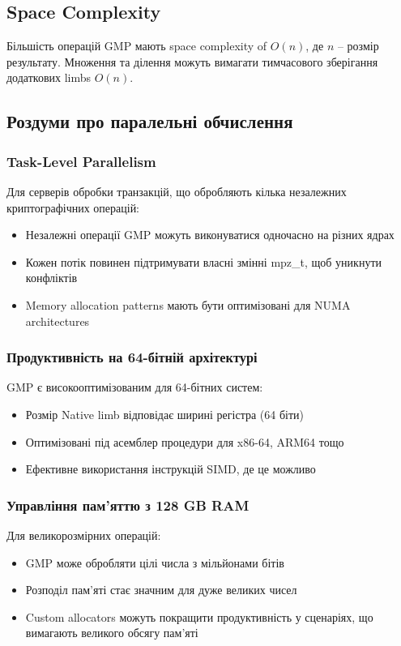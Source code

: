 \subsection{Space Complexity}
Більшість операцій GMP мають space complexity of $O(n)$, де $n$ -- розмір результату. Множення та ділення
можуть вимагати тимчасового зберігання додаткових limbs $O(n)$.

\subsection{Роздуми про паралельні обчислення}

\subsubsection{Task-Level Parallelism}
Для серверів обробки транзакцій, що обробляють кілька незалежних криптографічних операцій:
\begin{itemize}
    \item Незалежні операції GMP можуть виконуватися одночасно на різних ядрах
    \item Кожен потік повинен підтримувати власні змінні mpz\_t, щоб уникнути конфліктів
    \item Memory allocation patterns мають бути оптимізовані для NUMA architectures
\end{itemize}

\subsubsection{Продуктивність на 64-бітній архітектурі}
GMP є високооптимізованим для 64-бітних систем:
\begin{itemize}
    \item Розмір Native limb відповідає ширині регістра (64 біти)
    \item Оптимізовані під асемблер процедури для x86-64, ARM64 тощо
    \item Ефективне використання інструкцій SIMD, де це можливо
\end{itemize}

\subsubsection{Управління пам'яттю з 128 GB RAM}
Для великорозмірних операцій:
\begin{itemize}
    \item GMP може обробляти цілі числа з мільйонами бітів
    \item Розподіл пам'яті стає значним для дуже великих чисел
    \item Custom allocators можуть покращити продуктивність у сценаріях, що вимагають великого обсягу пам'яті
\end{itemize}

